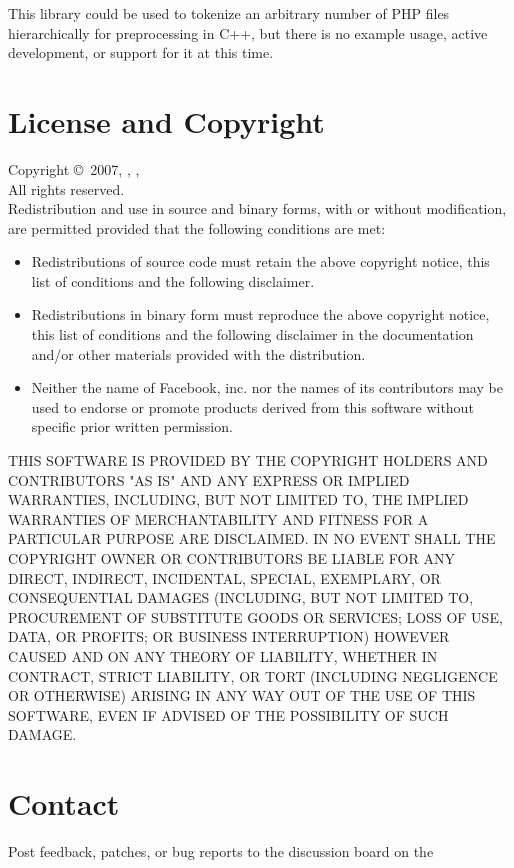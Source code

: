 \documentclass[11pt,titlepage]{article}
\begin{document}
This library could be used to tokenize an arbitrary number of PHP files hierarchically for preprocessing in C++, but there is no example usage, active development, or support for it at this time.


\newpage
\section{License and Copyright}

Copyright \copyright\ 2007, , , 
\\
All rights reserved.
\\

Redistribution and use in source and binary forms, with or without modification, are permitted provided that the following conditions are met:

\begin{itemize}

\item Redistributions of source code must retain the above copyright notice, this list of conditions and the following disclaimer.
\item Redistributions in binary form must reproduce the above copyright notice, this list of conditions and the following disclaimer in the documentation and/or other materials provided with the distribution.
\item Neither the name of Facebook, inc. nor the names of its contributors may be used to endorse or promote products derived from this software without specific prior written permission.

\end{itemize}

THIS SOFTWARE IS PROVIDED BY THE COPYRIGHT HOLDERS AND CONTRIBUTORS "AS IS" AND ANY EXPRESS OR IMPLIED WARRANTIES, INCLUDING, BUT NOT LIMITED TO, THE IMPLIED WARRANTIES OF MERCHANTABILITY AND FITNESS FOR A PARTICULAR PURPOSE ARE DISCLAIMED. IN NO EVENT SHALL THE COPYRIGHT OWNER OR CONTRIBUTORS BE LIABLE FOR ANY DIRECT, INDIRECT, INCIDENTAL, SPECIAL, EXEMPLARY, OR CONSEQUENTIAL DAMAGES (INCLUDING, BUT NOT LIMITED TO, PROCUREMENT OF SUBSTITUTE GOODS OR SERVICES; LOSS OF USE, DATA, OR PROFITS; OR BUSINESS INTERRUPTION) HOWEVER CAUSED AND ON ANY THEORY OF LIABILITY, WHETHER IN CONTRACT, STRICT LIABILITY, OR TORT (INCLUDING NEGLIGENCE OR OTHERWISE) ARISING IN ANY WAY OUT OF THE USE OF THIS SOFTWARE, EVEN IF ADVISED OF THE POSSIBILITY OF SUCH DAMAGE.

\section{Contact}

Post feedback, patches, or bug reports to the discussion board on the \\
\end{document}
